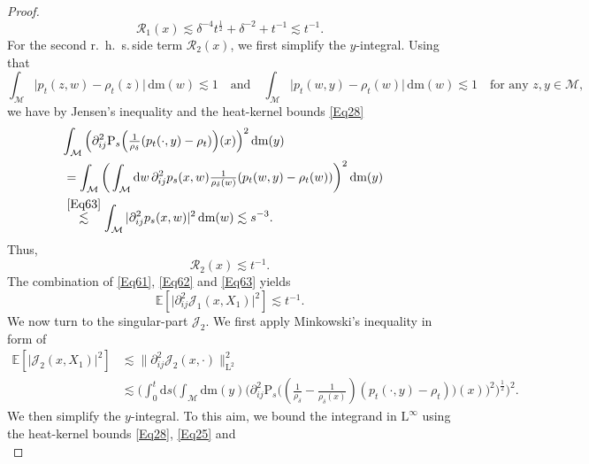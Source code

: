 \documentclass[11pt,a4paper,oneside]{amsart}
\numberwithin{equation}{section}
\newcommand{\dd}{\mathrm{d}}
\newcommand{\LL}{\mathrm{L}}
\newcommand{\rhs}{r.~h.~s.\,}
\newcommand{\m}{\mathrm{m}}
\begin{document}
\begin{proof}
\begin{equation}\label{Eq62}
\mathcal{R}_1(x)\lesssim \delta^{-4}t^{\frac{1}{2}}+\delta^{-2}+t^{-1}\lesssim t^{-1}.
\end{equation}
%
For the second \rhs side term $\mathcal{R}_2(x)$, we first simplify the $y$-integral. Using that 
%
\begin{equation}\label{Eq63}
\int_{\mathcal{M}}\vert p_t(z,w)-\rho_t(z)\vert\,\dd \m(w)\lesssim 1\quad\text{and}\quad\int_{\mathcal{M}}\vert p_t(w,y)-\rho_t(w)\vert\,\dd \m(w)\lesssim 1\quad \text{for any $z,y\in \mathcal{M}$,}
\end{equation}
%
we have by Jensen's inequality and the heat-kernel bounds \eqref{Eq28}
%
\begin{align*}
\lefteqn{\int_{\mathcal{M}}\Big(\partial^2_{ij}\text{P}_s\Big(\tfrac{1}{\rho_{\delta}}(p_t(\cdot,y)-\rho_t)\Big)(x)\Big)^2\,\dd \m(y)}\\ &=\int_{\mathcal{M}}\bigg(\int_{\mathcal{M}}\dd w\,\partial^2_{ij}p_{s}(x,w)\tfrac{1}{\rho_{\delta}(w)}(p_t(w,y)-\rho_t(w))\bigg)^{2}\,\dd \m(y)\\
&\stackrel{\eqref{Eq63}}{\lesssim}\int_{\mathcal{M}}\vert\partial^2_{ij}p_s(x,w)\vert^2\,\dd \m(w)\lesssim s^{-3}.
\end{align*}
%
Thus, 
%
\begin{equation}\label{Eq64}
\mathcal{R}_2(x)\lesssim t^{-1}.
\end{equation}
%
The combination of \eqref{Eq61}, \eqref{Eq62} and \eqref{Eq63} yields
%
\begin{equation}\label{Eq65}
\mathbb{E}[\vert\partial^2_{ij}\mathcal{J}_1(x,X_1)\vert^2]\lesssim t^{-1}.
\end{equation}
%
We now turn to the singular-part $\mathcal{J}_2$. We first apply Minkowski's inequality in form of
%
\begin{equation}\label{Eq66}
\begin{split}
\mathbb{E}[\vert\mathcal{J}_2(x,X_1)\vert^2]&\lesssim \|\partial^2_{ij}\mathcal{J}_2(x,\cdot)\|^2_{\LL^{2}}\\& \lesssim \bigg(\int_{0}^t\dd s\bigg(\int_{\mathcal{M}}\dd \m(y)\Big(\partial^2_{ij}\text{P}_s\Big((\tfrac{1}{\rho_{\delta}}-\tfrac{1}{\rho_{\delta}(x)})(p_t(\cdot,y)-\rho_t)\Big)(x)\Big)^2\bigg)^{\frac{1}{2}}\bigg)^{2}.
\end{split}
\end{equation}
%
We then simplify the $y$-integral. To this aim, we bound the integrand in $\LL^{\infty}$ using the heat-kernel bounds \eqref{Eq28}, \eqref{Eq25} and 
%
\begin{equation}\label{Eq29}

\end{equation}
\end{proof}
\end{document}
